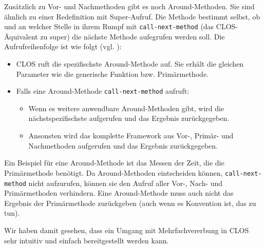 Zusätzlich zu Vor- und Nachmethoden gibt es noch Around-Methoden. Sie sind ähnlich zu einer Redefinition mit Super-Aufruf. Die Methode bestimmt selbst, ob und an welcher Stelle in ihrem Rumpf mit \texttt{call-next-method} (das CLOS-Äquivalent zu super) die nächste Methode aufegrufen werden soll. Die Aufrufreihenfolge ist wie folgt (vgl. \cite[S.103]{keene}):
\begin{itemize}
 \item CLOS ruft die spezifischste Around-Methode auf. Sie erhält die gleichen Parameter wie die generische Funktion bzw. Primärmethode.
 \item Falls eine Around-Methode \texttt{call-next-method} aufruft:
 \begin{itemize}
  \item Wenn es weitere anwendbare Around-Methoden gibt, wird die nächstspezifischste aufgerufen und das Ergebnis zurückgegeben.
  \item Ansonsten wird das komplette Framework aus Vor-, Primär- und Nachmethoden aufgerufen und das Ergebnis zurückgegeben.
 \end{itemize}
\end{itemize}

Ein Beispiel für eine Around-Methode ist das Messen der Zeit, die die Primärmethode benötigt. Da Around-Methoden eintscheiden können, \texttt{call-next-method} nicht aufzurufen, können sie den Aufruf aller Vor-, Nach- und Primärmethoden verhindern. Eine Around-Methode muss auch nicht das Ergebnis der Primärmethode zurückgeben (auch wenn es Konvention ist, das zu tun).

Wir haben damit gesehen, dass ein Umgang mit Mehrfachvererbung in CLOS sehr intuitiv und einfach bereitgestellt werden kann.